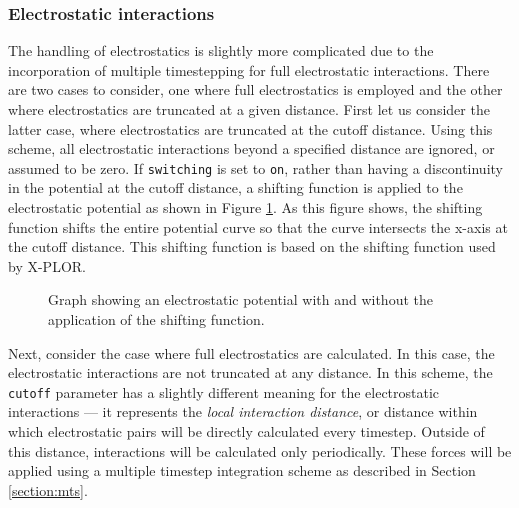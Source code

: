 \subsubsection{Electrostatic interactions}
The handling of electrostatics is slightly
more complicated due to the incorporation of multiple timestepping for full
electrostatic interactions.  There are two cases to consider, one where
full electrostatics is employed and the other where electrostatics
are truncated at a given distance.
\prettypar
First let us consider the latter case, where electrostatics are truncated at
the cutoff distance.  Using this scheme, all electrostatic interactions
beyond a specified distance are ignored, or assumed to be zero.  If
{\tt switching} is set to {\tt on}, rather than having a discontinuity
in the potential
at the cutoff distance, a shifting function is applied to the electrostatic
potential as shown in Figure \ref{fig:shifting}.  As this figure shows, the
shifting function shifts the entire potential curve so that the curve
intersects the x-axis at the cutoff distance.  This shifting function
is based on the
shifting function used by X-PLOR.

\begin{figure}[htb]
  \caption[Graph of electrostatic potential with and without shifting function]
  {\small Graph showing an electrostatic potential with and without the
  application of the shifting function.}
  \label{fig:shifting}
\end{figure}

Next, consider the case where full electrostatics are calculated.  In this
case, the electrostatic interactions are not truncated at any distance.  In
this scheme, the {\tt cutoff} parameter has a slightly different meaning
for the electrostatic interactions --- it represents
the {\it local interaction distance\/}, or distance within which electrostatic
pairs will be directly calculated every timestep.  Outside of this distance,
interactions will be calculated only periodically.  These forces
will be applied using a multiple timestep integration scheme as described in
Section \ref{section:mts}.

